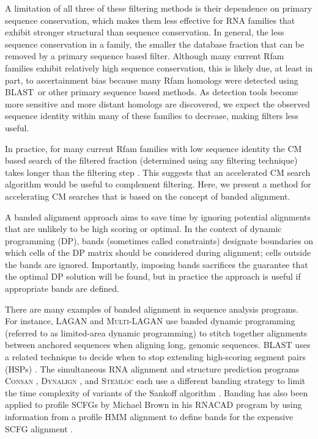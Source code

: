 \documentclass[11pt]{article}
\def\blast{\textsc{BLAST}~}
\begin{document}
A limitation of all three of these filtering methods is their
dependence on primary sequence conservation, which makes them less
effective for RNA families that exhibit stronger structural than
sequence conservation. In general, the less sequence
conservation in a family, the smaller the database fraction that can
be removed by a primary sequence based filter. 
Although many current Rfam families exhibit relatively high sequence
conservation, this is likely due, at least in part, to ascertainment
bias because many Rfam homologs were detected using \blast or other primary
sequence based methods. 
As detection tools become more sensitive and more distant homologs
are discovered,
we expect the observed
sequence identity within many of these families to decrease, making
filters less useful.

In practice, for many current Rfam families with low sequence identity
the CM based search of the filtered fraction (determined using any
filtering technique) takes longer than the filtering step
\cite{Weinberg05}. This suggests that an accelerated CM search
algorithm would be useful to complement filtering. Here, we present a
method for accelerating CM searches that is based on the concept of
banded alignment. 

A banded alignment approach aims to save time by ignoring 
potential alignments that are unlikely to be high scoring or
optimal. 
In the context of dynamic programming (DP), bands (sometimes
called constraints) designate boundaries on which
cells of the DP matrix should be considered during alignment;
cells outside the bands are ignored. Importantly, imposing bands
sacrifices the guarantee that the optimal DP solution will be found,
but in practice the approach is useful if appropriate bands are
defined. 

There are many examples of banded alignment in sequence
analysis programs. For instance, \textsc{LAGAN} and
\textsc{Multi-LAGAN} use banded dynamic programming (referred to as
limited-area dynamic programming) to stitch together alignments
between anchored sequences when aligning long, genomic sequences.
\textsc{BLAST} uses a related technique
to decide when to stop extending high-scoring segment pairs (HSPs)
\cite{Altschul90}. 
The simultaneous RNA alignment and structure prediction programs
\textsc{Consan} \cite{Dowell06}, \textsc{Dynalign} \cite{Mathews05},
and \textsc{Stemloc} \cite{Holmes05} each use a different banding strategy
to limit the time complexity of variants of the Sankoff algorithm
\cite{Sankoff85}. Banding has also been applied to profile SCFGs by
Michael Brown in his \textsc{RNACAD} program by using information from
a profile HMM alignment to define bands for the expensive SCFG
alignment \cite{Brown00}. 
\end{document}
